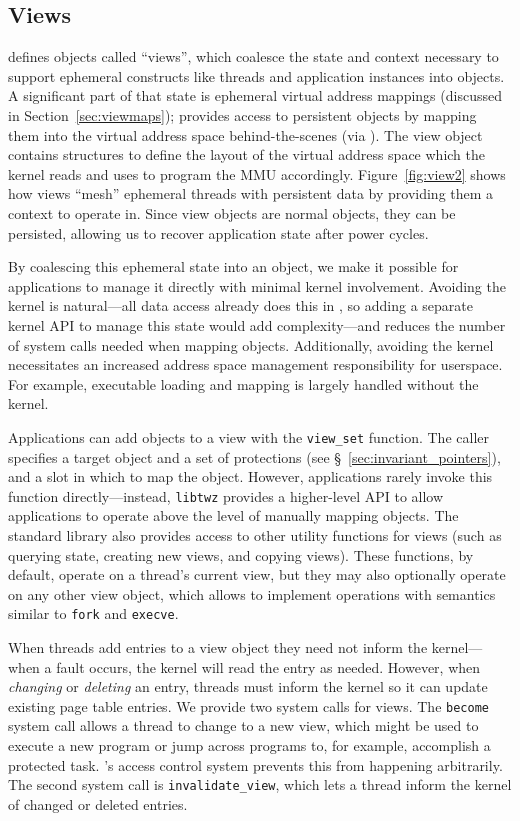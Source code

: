 \subsection{Views}

\Twizzler defines objects called ``views'', which coalesce the state
and context necessary to support ephemeral constructs like threads and application instances into
\Twizzler objects. A significant part of that state is ephemeral virtual address mappings (discussed in Section~\ref{sec:viewmaps}); \Twizzler
provides access to persistent objects by mapping them into the virtual address space
behind-the-scenes (via \libcore). The view object contains structures to define the layout of the
virtual address space which the kernel reads and uses to program the MMU accordingly. Figure~\ref{fig:view2} shows how
views ``mesh'' ephemeral threads with persistent data by providing them a context to operate in.
Since view objects are normal \Twizzler objects, they can be persisted, allowing
us to recover application state after power cycles.

By coalescing this ephemeral state
into an object, we make it possible for applications to manage it directly with minimal kernel
involvement. Avoiding the kernel is natural---all data access already does this in \Twizzler, so
adding a separate kernel API to manage this state would add complexity---and reduces the number of
system calls needed when mapping objects. Additionally, avoiding the kernel necessitates an
increased address space management responsibility for userspace. For example, executable loading
and mapping is largely handled without the kernel.

Applications can add objects to a view with the \texttt{view\_set} function. The caller specifies a
target object and a set of protections (see \S~\ref{sec:invariant_pointers}), and a slot in which to
map the object. However, applications rarely invoke this function directly---instead,
\texttt{libtwz} provides a higher-level API to allow applications to operate above the level of
manually mapping objects. The standard library also provides access to other utility functions for
views (such as querying state, creating new views, and copying views). These functions, by default,
operate on a thread's current view, but they may also optionally operate on any other view object,
which allows \Twizzler to implement operations with semantics similar to \texttt{fork} and \texttt{execve}.

When threads add entries to a view object they need not inform the kernel---when
a fault occurs, the kernel will read the entry as needed. However, when \emph{changing} or
\emph{deleting} an entry, threads must inform the kernel so it can update existing page table entries.
We provide two system calls for views. The \texttt{become} system call allows a thread to
change to a new view, which might be used to execute a new program or jump across programs to, for
example, accomplish a protected task. \Twizzler's access control system prevents this from happening
arbitrarily. The second system call is \texttt{invalidate\_view}, which lets a thread inform the
kernel of changed or deleted entries.

